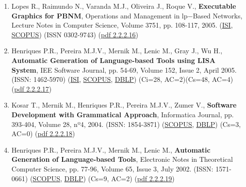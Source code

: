 \documentclass[11pt]{article}
\begin{document}
\begin{enumerate}
\item{ Lopes R., Raimundo N., Varanda M.J., Oliveira J., Roque V., {\bf{ Executable Graphics for PBNM}}, Operations and Management in lp$-$Based Networks, Lecture Notes in Computer Science, Volume 3751, pp. 108-117, 2005. (\href{run:Publicacoes/ComprovativosISI.pdf}{ISI}, \href{run:Publicacoes/PublicacoesSCOPUS.pdf}{SCOPUS}) (ISSN 0302-9743) (\href{run:Publicacoes/publicacoes/83.pdf}{pdf 2.2.2.16})}
\item{ Henriques P.R., Pereira M.J.V., Mernik M., Lenic M., Gray J., Wu H., {\bf{ Automatic Generation of Language-based Tools using LISA System}}, IEE Software Journal, pp. 54-69, Volume 152, Issue 2, April 2005. (ISSN: 1462-5970) (\href{run:Publicacoes/ComprovativosISI.pdf}{ISI}, \href{run:Publicacoes/PublicacoesSCOPUS.pdf}{SCOPUS}, \href{run:Publicacoes/ComprovativosDBLP.pdf}{DBLP}) (Ci=28, AC=2)(Cs=48, AC=4) (\href{run:Publicacoes/publicacoes/11.pdf}{pdf 2.2.2.17})}
\item{ Kosar T., Mernik M., Henriques P.R., Pereira M.J.V., Zumer V., {\bf{ Software Development with Grammatical Approach}}, Informatica Journal, pp. 393-404, Volume 28, nº4, 2004. (ISSN: 1854-3871) (\href{run:Publicacoes/PublicacoesSCOPUS.pdf}{SCOPUS}, \href{run:Publicacoes/ComprovativosDBLP.pdf}{DBLP}) (Cs=3, AC=0) (\href{run:Publicacoes/publicacoes/10.pdf}{pdf 2.2.2.18}) }
\item{ Henriques P.R., Pereira M.J.V., Mernik M., Lenic M., {\bf{ Automatic Generation of Language-based Tools}},  Electronic Notes in Theoretical Computer Science, pp. 77-96, Volume 65, Issue 3, July 2002. (ISSN: 1571-0661) (\href{run:Publicacoes/PublicacoesSCOPUS.pdf}{SCOPUS}, \href{run:Publicacoes/ComprovativosDBLP.pdf}{DBLP}) (Cs=9, AC=2) (\href{run:Publicacoes/publicacoes/6.pdf}{pdf 2.2.2.19}) }

\end{enumerate}
\end{document}
